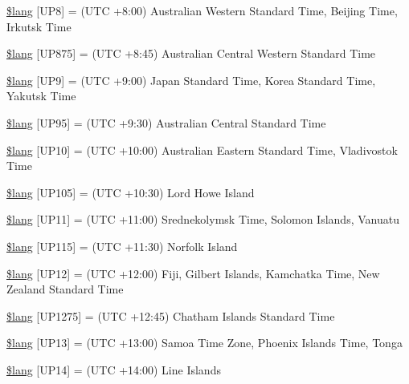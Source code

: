 \begin{DoxyCompactItemize}
\item 
\hyperlink{date__lang_8php_a2a828a680158ca4cfb7fba60f35c67a3}{\$lang} \mbox{[}\textquotesingle{}U\+P8\textquotesingle{}\mbox{]} = \textquotesingle{}(U\+T\+C +8\+:00) Australian Western Standard Time, Beijing Time, Irkutsk Time\textquotesingle{}
\item 
\hyperlink{date__lang_8php_a486696d3d41c5d263a8b550903052ecb}{\$lang} \mbox{[}\textquotesingle{}U\+P875\textquotesingle{}\mbox{]} = \textquotesingle{}(U\+T\+C +8\+:45) Australian Central Western Standard Time\textquotesingle{}
\item 
\hyperlink{date__lang_8php_aa112bfd057369e5adb437c55457c9f79}{\$lang} \mbox{[}\textquotesingle{}U\+P9\textquotesingle{}\mbox{]} = \textquotesingle{}(U\+T\+C +9\+:00) Japan Standard Time, Korea Standard Time, Yakutsk Time\textquotesingle{}
\item 
\hyperlink{date__lang_8php_a96965669ac4830ab024b39a4ebb763f1}{\$lang} \mbox{[}\textquotesingle{}U\+P95\textquotesingle{}\mbox{]} = \textquotesingle{}(U\+T\+C +9\+:30) Australian Central Standard Time\textquotesingle{}
\item 
\hyperlink{date__lang_8php_ab55df5b1ac6457c16ea32f01070966f6}{\$lang} \mbox{[}\textquotesingle{}U\+P10\textquotesingle{}\mbox{]} = \textquotesingle{}(U\+T\+C +10\+:00) Australian Eastern Standard Time, Vladivostok Time\textquotesingle{}
\item 
\hyperlink{date__lang_8php_aeb674ae9d76fd6d0d9c9e77ed5a212e9}{\$lang} \mbox{[}\textquotesingle{}U\+P105\textquotesingle{}\mbox{]} = \textquotesingle{}(U\+T\+C +10\+:30) Lord Howe Island\textquotesingle{}
\item 
\hyperlink{date__lang_8php_a463ad4d63523352c17685f734b4ec7cc}{\$lang} \mbox{[}\textquotesingle{}U\+P11\textquotesingle{}\mbox{]} = \textquotesingle{}(U\+T\+C +11\+:00) Srednekolymsk Time, Solomon Islands, Vanuatu\textquotesingle{}
\item 
\hyperlink{date__lang_8php_a46fa8957c8e606d1641bbcdd75cd2df0}{\$lang} \mbox{[}\textquotesingle{}U\+P115\textquotesingle{}\mbox{]} = \textquotesingle{}(U\+T\+C +11\+:30) Norfolk Island\textquotesingle{}
\item 
\hyperlink{date__lang_8php_a18a8bb072c3fe7db99091538ce5168be}{\$lang} \mbox{[}\textquotesingle{}U\+P12\textquotesingle{}\mbox{]} = \textquotesingle{}(U\+T\+C +12\+:00) Fiji, Gilbert Islands, Kamchatka Time, New Zealand Standard Time\textquotesingle{}
\item 
\hyperlink{date__lang_8php_a92e3c23bd9d963bbdfd21e39521bfdc1}{\$lang} \mbox{[}\textquotesingle{}U\+P1275\textquotesingle{}\mbox{]} = \textquotesingle{}(U\+T\+C +12\+:45) Chatham Islands Standard Time\textquotesingle{}
\item 
\hyperlink{date__lang_8php_ac197fec09ff547ca12a7fe3ffc5908ae}{\$lang} \mbox{[}\textquotesingle{}U\+P13\textquotesingle{}\mbox{]} = \textquotesingle{}(U\+T\+C +13\+:00) Samoa Time Zone, Phoenix Islands Time, Tonga\textquotesingle{}
\item 
\hyperlink{date__lang_8php_a50562230c497ebdba1f540d409110fce}{\$lang} \mbox{[}\textquotesingle{}U\+P14\textquotesingle{}\mbox{]} = \textquotesingle{}(U\+T\+C +14\+:00) Line Islands\textquotesingle{}
\end{DoxyCompactItemize}



